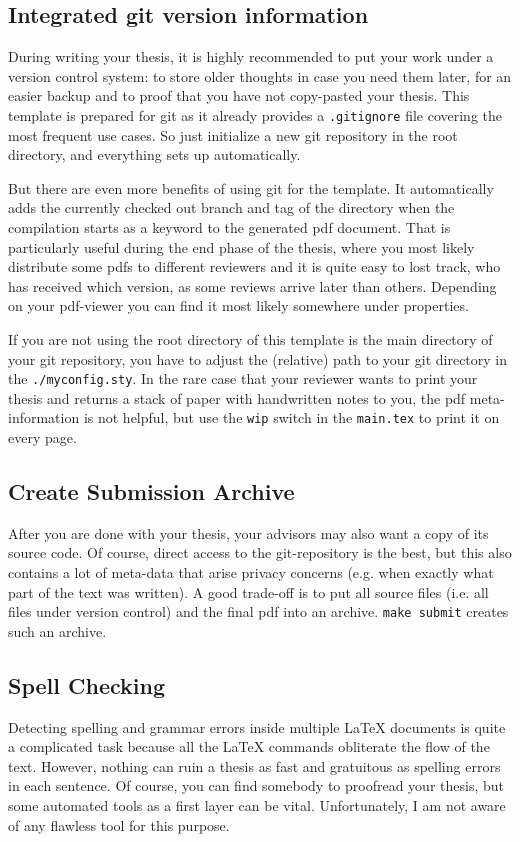\documentclass[../main.tex]{subfiles}
\begin{document}
\subsection{Integrated git version information}
During writing your thesis, it is highly recommended to put your work under a version control system: to store older thoughts in case you need them later, for an easier backup and to proof that you have not copy-pasted your thesis.
This template is prepared for git as it already provides a \texttt{.gitignore} file covering the most frequent use cases.
So just initialize a new git repository in the root directory, and everything sets up automatically.

But there are even more benefits of using git for the template.
It automatically adds the currently checked out branch and tag of the directory when the compilation starts as a keyword to the generated pdf document.
That is particularly useful during the end phase of the thesis, where you most likely distribute some pdfs to different reviewers and it is quite easy to lost track, who has received which version, as some reviews arrive later than others.
Depending on your pdf-viewer you can find it most likely somewhere under properties.

If you are not using the root directory of this template is the main directory of your git repository, you have to adjust the (relative) path to your git directory in the \texttt{./myconfig.sty}.
In the rare case that your reviewer wants to print your thesis and returns a stack of paper with handwritten notes to you, the pdf meta-information is not helpful, but use the \texttt{wip} switch in the \texttt{main.tex} to print it on every page.

\subsection{Create Submission Archive}
After you are done with your thesis, your advisors may also want a copy of its source code.
Of course, direct access to the git-repository is the best, but this also contains a lot of meta-data that arise privacy concerns (e.g. when exactly what part of the text was written).
A good trade-off is to put all source files (i.e. all files under version control) and the final pdf into an archive.
\texttt{make submit} creates such an archive.

\subsection{Spell Checking}
Detecting spelling and grammar errors inside multiple LaTeX documents is quite a complicated task because all the LaTeX commands obliterate the flow of the text.
However, nothing can ruin a thesis as fast and gratuitous as spelling errors in each sentence.
Of course, you can find somebody to proofread your thesis, but some automated tools as a first layer can be vital.
Unfortunately, I am not aware of any flawless tool for this purpose.
\end{document}
